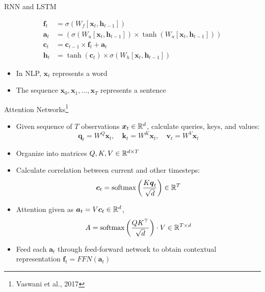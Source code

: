\documentclass{beamer}
\def \R{\ensuremath \mathbb{R}}
\newcommand{\vect}[1]{\boldsymbol{#1}}
\theoremstyle{definition}
\begin{document}
\begin{frame}{RNN and LSTM}
\begin{figure}
{  \begin{align*}
    \vect f_t &= \sigma(W_f[\vect x_t, \vect h_{t-1}]) \\
    \vect a_t &= \left(\sigma(W_u[\vect x_t, \vect h_{t-1}]) \times \tanh(W_a[\vect x_t, \vect h_{t-1}]) \right) \\
    \vect c_t &= \vect c_{t-1} \times \vect f_t + \vect a_t \\
    \vect h_t &= \tanh(\vect c_t) \times \sigma(W_h[\vect x_t, \vect h_{t-1}])
  \end{align*}
  }
  \end{figure}
  \endminipage
  \begin{itemize}
      \begin{itemize}
        \item In NLP, $\vect x_t$ represents a word
        \item The sequence $\vect x_0, \vect x_1, \ldots, \vect x_T$ represents a sentence
      \end{itemize}
  \end{itemize}
\end{frame}

\begin{frame}{Attention Networks\footnote{Vaswani et al., 2017}}
\begin{itemize}
  \item Given sequence of $T$ observations $\vect x_t \in \R^d$, calculate queries, keys, and values:
    \[\vect q_t = W^Q \vect x_t, \quad \vect k_t = W^K \vect x_t, \quad \vect v_t = W^V \vect x_t\]
  \item Organize into matrices $Q, K, V \in \R^{d\times T}$
  \item<2-> Calculate correlation between current and other timesteps:
    \[\vect c_t = \text{softmax}\left(\displaystyle \frac{K\vect q_t}{\sqrt d}\right) \in \R^T\]
  \item<3-> Attention given as $\vect a_t = V\vect c_t \in \R^d$, 
      \[A = \text{softmax}\left(\displaystyle \frac{QK^\top}{\sqrt d} \right) \cdot V \in \R^{T \times d}\]
  \item<4-> Feed each $\vect a_t$ through feed-forward network to obtain contextual representation $\vect f_t = FFN(\vect a_t)$
\end{itemize}
\end{frame}
\end{document}
